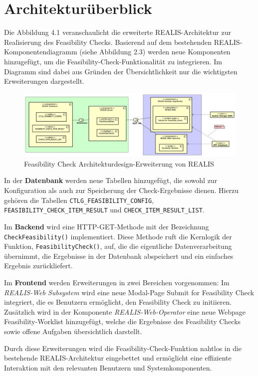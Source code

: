 \section{Architekturüberblick}

Die Abbildung 4.1 veranschaulicht die erweiterte REALIS-Architektur zur Realisierung des Feasibility Checks. Basierend auf dem bestehenden REALIS-Komponentendiagramm (siehe Abbildung 2.3) werden neue Komponenten hinzugefügt, um die Feasibility-Check-Funktionalität zu integrieren. Im Diagramm sind dabei aus Gründen der Übersichtlichkeit nur die wichtigsten Erweiterungen dargestellt.

\begin{figure}[!htbp]
    \centering
    \includegraphics[width=1\textwidth]{bilder/Feasibility-Komponentendiagramm.png}
    \caption{Feasibility Check Architekturdesign-Erweiterung von \gls{REALIS}}
    \label{fig:feasibility-check-komponentendiagramm}
\end{figure}


In der \textbf{Datenbank} werden neue Tabellen hinzugefügt, die sowohl zur Konfiguration als auch zur Speicherung der Check-Ergebnisse dienen. Hierzu gehören die Tabellen \texttt{CTLG\_FEASIBILITY\_CONFIG}, \texttt{FEASIBILITY\_CHECK\_ITEM\_RESULT} und \texttt{CHECK\_ITEM\_\-RESULT\_\-LIST}.

Im \textbf{Backend} wird eine HTTP-GET-Methode mit der Bezeichnung \texttt{CheckFeasibility()} implementiert. Diese Methode ruft die Kernlogik der Funktion, \texttt{FeasibilityCheck()}, auf, die die eigentliche Datenverarbeitung übernimmt, die Ergebnisse in der Datenbank abspeichert und ein einfaches Ergebnis zurückliefert.

Im \textbf{Frontend} werden Erweiterungen in zwei Bereichen vorgenommen: Im \textit{REALIS-Web Subsystem} wird eine neue Modal-Page \glqq Submit for Feasibility Check\grqq{} integriert, die es Benutzern ermöglicht, den Feasibility Check zu initiieren. Zusätzlich wird in der Komponente \textit{REALIS-Web-Operator} eine neue Webpage \glqq Feasibility-Worklist\grqq{} hinzugefügt, welche die Ergebnisse des Feasibility Checks sowie offene Aufgaben übersichtlich darstellt.

Durch diese Erweiterungen wird die Feasibility-Check-Funktion nahtlos in die bestehende REALIS-Architektur eingebettet und ermöglicht eine effiziente Interaktion mit den relevanten Benutzern und Systemkomponenten.


